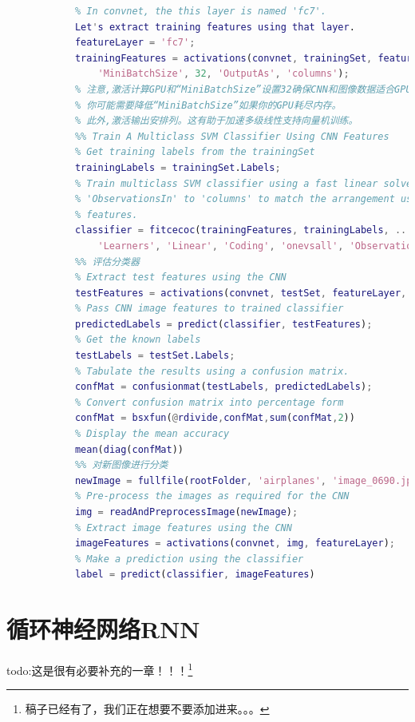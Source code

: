 \begin{lstlisting}[language = Matlab]
            % but typically starting with the layer right before the classification layer is a good place to start.
            % In convnet, the this layer is named 'fc7'.
            Let's extract training features using that layer.
            featureLayer = 'fc7';
            trainingFeatures = activations(convnet, trainingSet, featureLayer, ...
                'MiniBatchSize', 32, 'OutputAs', 'columns');
            % 注意,激活计算GPU和“MiniBatchSize”设置32确保CNN和图像数据适合GPU内存。
            % 你可能需要降低“MiniBatchSize”如果你的GPU耗尽内存。
            % 此外,激活输出安排列。这有助于加速多级线性支持向量机训练。
            %% Train A Multiclass SVM Classifier Using CNN Features
            % Get training labels from the trainingSet
            trainingLabels = trainingSet.Labels;
            % Train multiclass SVM classifier using a fast linear solver, and set
            % 'ObservationsIn' to 'columns' to match the arrangement used for training
            % features.
            classifier = fitcecoc(trainingFeatures, trainingLabels, ...
                'Learners', 'Linear', 'Coding', 'onevsall', 'ObservationsIn', 'columns');
            %% 评估分类器
            % Extract test features using the CNN
            testFeatures = activations(convnet, testSet, featureLayer, 'MiniBatchSize',32);
            % Pass CNN image features to trained classifier
            predictedLabels = predict(classifier, testFeatures);
            % Get the known labels
            testLabels = testSet.Labels;
            % Tabulate the results using a confusion matrix.
            confMat = confusionmat(testLabels, predictedLabels);
            % Convert confusion matrix into percentage form
            confMat = bsxfun(@rdivide,confMat,sum(confMat,2))
            % Display the mean accuracy
            mean(diag(confMat))
            %% 对新图像进行分类
            newImage = fullfile(rootFolder, 'airplanes', 'image_0690.jpg');
            % Pre-process the images as required for the CNN
            img = readAndPreprocessImage(newImage);
            % Extract image features using the CNN
            imageFeatures = activations(convnet, img, featureLayer);
            % Make a prediction using the classifier
            label = predict(classifier, imageFeatures)
            \end{lstlisting}

\section{循环神经网络RNN}

% 
    todo:这是很有必要补充的一章！！！\footnote{稿子已经有了，我们正在想要不要添加进来。。。}
